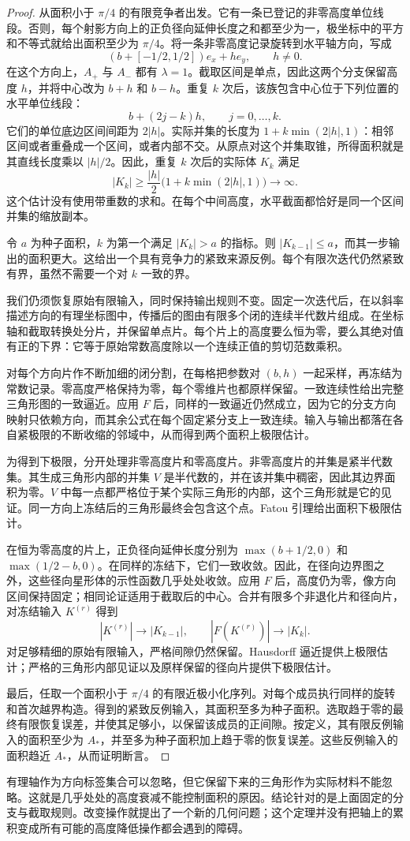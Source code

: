 \begin{proof}
从面积小于 $\pi/4$ 的有限竞争者出发。它有一条已登记的非零高度单位线段。否则，每个射影方向上的正负径向延伸长度之和都至少为一，极坐标中的平方和不等式就给出面积至少为 $\pi/4$。将一条非零高度记录旋转到水平轴方向，写成
\[
 (b+[-1/2,1/2])e_x+h e_y,\qquad h\ne0.
\]
在这个方向上，$A_+$ 与 $A_-$ 都有 $\lambda=1$。截取区间是单点，因此这两个分支保留高度 $h$，并将中心改为 $b+h$ 和 $b-h$。重复 $k$ 次后，该族包含中心位于下列位置的水平单位线段：
\[
 b+(2j-k)h,\qquad j=0,\ldots,k.
\]
它们的单位底边区间间距为 $2|h|$。实际并集的长度为 $1+k\min(2|h|,1)$：相邻区间或者重叠成一个区间，或者内部不交。从原点对这个并集取锥，所得面积就是其直线长度乘以 $|h|/2$。因此，重复 $k$ 次后的实际体 $K_k$ 满足
\begin{equation}\label{eq:axis-growth}
 |K_k|\ge\frac{|h|}{2}\bigl(1+k\min(2|h|,1)\bigr)\longrightarrow\infty.
\end{equation}
这个估计没有使用带重数的求和。在每个中间高度，水平截面都恰好是同一个区间并集的缩放副本。

令 $a$ 为种子面积，$k$ 为第一个满足 $|K_k|>a$ 的指标。则 $|K_{k-1}|\le a$，而其一步输出的面积更大。这给出一个具有竞争力的紧致来源反例。每个有限次迭代仍然紧致有界，虽然不需要一个对 $k$ 一致的界。

我们仍须恢复原始有限输入，同时保持输出规则不变。固定一次迭代后，在以斜率描述方向的有理坐标图中，传播后的图由有限多个闭的连续半代数片组成。在坐标轴和截取转换处分片，并保留单点片。每个片上的高度要么恒为零，要么其绝对值有正的下界：它等于原始常数高度除以一个连续正值的剪切范数乘积。

对每个方向片作不断加细的闭分割，在每格把参数对 $(b,h)$ 一起采样，再冻结为常数记录。零高度严格保持为零，每个零维片也都原样保留。一致连续性给出完整三角形图的一致逼近。应用 $F$ 后，同样的一致逼近仍然成立，因为它的分支方向映射只依赖方向，而其余公式在每个固定紧分支上一致连续。输入与输出都落在各自紧极限的不断收缩的邻域中，从而得到两个面积上极限估计。

为得到下极限，分开处理非零高度片和零高度片。非零高度片的并集是紧半代数集。其生成三角形内部的并集 $V$ 是半代数的，并在该并集中稠密，因此其边界面积为零。$V$ 中每一点都严格位于某个实际三角形的内部，这个三角形就是它的见证。同一方向上冻结后的三角形最终会包含这个点。Fatou 引理给出面积下极限估计。

在恒为零高度的片上，正负径向延伸长度分别为 $\max(b+1/2,0)$ 和 $\max(1/2-b,0)$。在同样的冻结下，它们一致收敛。因此，在径向边界图之外，这些径向星形体的示性函数几乎处处收敛。应用 $F$ 后，高度仍为零，像方向区间保持固定；相同论证适用于截取后的中心。合并有限多个非退化片和径向片，对冻结输入 $K^{(r)}$ 得到
\[
 |K^{(r)}|\to|K_{k-1}|,
 \qquad |F(K^{(r)})|\to|K_k|.
\]
对足够精细的原始有限输入，严格间隙仍然保留。Hausdorff 逼近提供上极限估计；严格的三角形内部见证以及原样保留的径向片提供下极限估计。

最后，任取一个面积小于 $\pi/4$ 的有限近极小化序列。对每个成员执行同样的旋转和首次越界构造。得到的紧致反例输入，其面积至多为种子面积。选取趋于零的最终有限恢复误差，并使其足够小，以保留该成员的正间隙。按定义，其有限反例输入的面积至少为 $A_*$，并至多为种子面积加上趋于零的恢复误差。这些反例输入的面积趋近 $A_*$，从而证明断言。
\end{proof}

有理轴作为方向标签集合可以忽略，但它保留下来的三角形作为实际材料不能忽略。这就是几乎处处的高度衰减不能控制面积的原因。结论针对的是上面固定的分支与截取规则。改变操作就提出了一个新的几何问题；这个定理并没有把轴上的累积变成所有可能的高度降低操作都会遇到的障碍。

